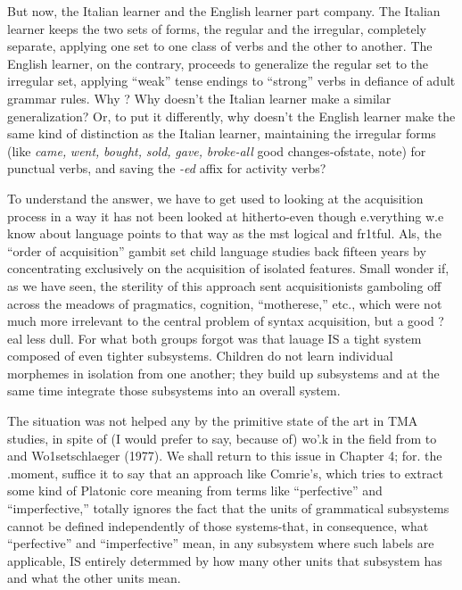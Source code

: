But now, the Italian learner and the English learner part com\-pany. The Italian learner keeps the two sets of forms, the regular and the irregular, completely separate, applying one set to one class of verbs and the other to another. The English learner, on the contrary, proceeds to generalize the regular set to the irregular set, applying ``weak'' tense endings to ``strong'' verbs in defiance of adult grammar rules. Why ? Why doesn't the Italian learner make a similar generaliza\-tion? Or, to put it differently, why doesn't the English learner make the same kind of distinction as the Italian learner, maintaining the irregular forms (like \textit{came,} \textit{went,} \textit{bought,} \textit{sold,} \textit{gave,} \textit{broke-all} good changes-ofstate, note) for punctual verbs, and saving the \textit{-ed} affix for activity verbs?

To understand the answer, we have to get used to looking at the
acquisition process in a way it has not been looked at hitherto-even though e.verything w.e know about language points to that way as the mst logical and fr1tful. Als, the ``order of acquisition'' gambit set child language studies back fifteen years by concentrating exclusively on the acquisition of isolated features. Small wonder if, as we have seen, the sterility of this approach sent acquisitionists gamboling off across the meadows of pragmatics, cognition, ``motherese,'' etc., which were not much more irrelevant to the central problem of syntax acquisition, but a good ?eal less dull. For what both groups forgot was that lauage IS a tight system composed of even tighter subsystems. Children do not learn individual morphemes in isolation from
one another; they build up subsystems and at the same time integrate those subsystems into an overall system.

The situation was not helped any by the primitive state of the art in TMA studies, in spite of (I would prefer to say, because of) wo'.k in the field from \citet{Reichenbach1947} to \citet{Comrie1976} and Wo1setschlaeger (1977). We shall return to this issue in Chapter 4; for. the .moment, suffice it to say that an approach like Comrie's,
which tries to extract some kind of Platonic core meaning from terms like ``perfective'' and ``imperfective,'' totally ignores the fact that the units of grammatical subsystems cannot be defined independently of those systems-that, in consequence, what ``perfective'' and ``imperfective'' mean, in any subsystem where such labels are applicable,
IS entirely determmed by how many other units that subsystem has and what the other units mean.

